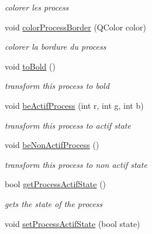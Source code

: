 \begin{DoxyCompactItemize}
\begin{DoxyCompactList}\small\item\em colorer les process \end{DoxyCompactList}\item 
\hypertarget{classGProcess_ad4aeb7c475dfde8f6dd3b03197999130}{void \hyperlink{classGProcess_ad4aeb7c475dfde8f6dd3b03197999130}{color\+Process\+Border} (Q\+Color color)}\label{classGProcess_ad4aeb7c475dfde8f6dd3b03197999130}

\begin{DoxyCompactList}\small\item\em colorer la bordure du process \end{DoxyCompactList}\item 
\hypertarget{classGProcess_af9ae3c70bc7db3aba93a3e938658c582}{void \hyperlink{classGProcess_af9ae3c70bc7db3aba93a3e938658c582}{to\+Bold} ()}\label{classGProcess_af9ae3c70bc7db3aba93a3e938658c582}

\begin{DoxyCompactList}\small\item\em transform this process to bold \end{DoxyCompactList}\item 
\hypertarget{classGProcess_a783c4847acfd5bd2acfd6f502d1429d1}{void \hyperlink{classGProcess_a783c4847acfd5bd2acfd6f502d1429d1}{be\+Actif\+Process} (int r, int g, int b)}\label{classGProcess_a783c4847acfd5bd2acfd6f502d1429d1}

\begin{DoxyCompactList}\small\item\em transform this process to actif state \end{DoxyCompactList}\item 
\hypertarget{classGProcess_a68cad4f4af27c756840c6995a345e0cb}{void \hyperlink{classGProcess_a68cad4f4af27c756840c6995a345e0cb}{be\+Non\+Actif\+Process} ()}\label{classGProcess_a68cad4f4af27c756840c6995a345e0cb}

\begin{DoxyCompactList}\small\item\em transform this process to non actif state \end{DoxyCompactList}\item 
\hypertarget{classGProcess_aa1da235a0736b84881b31324a44a7728}{bool \hyperlink{classGProcess_aa1da235a0736b84881b31324a44a7728}{get\+Process\+Actif\+State} ()}\label{classGProcess_aa1da235a0736b84881b31324a44a7728}

\begin{DoxyCompactList}\small\item\em gets the state of the process \end{DoxyCompactList}\item 
\hypertarget{classGProcess_aff73c9425ab78c8b282ac5c9c1b23ac7}{void \hyperlink{classGProcess_aff73c9425ab78c8b282ac5c9c1b23ac7}{set\+Process\+Actif\+State} (bool state)}\label{classGProcess_aff73c9425ab78c8b282ac5c9c1b23ac7}


\end{DoxyCompactItemize}
